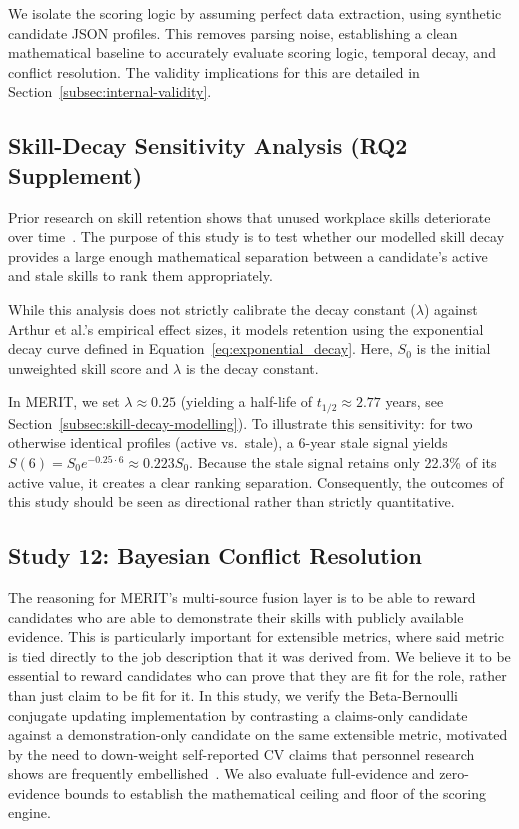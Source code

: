 We isolate the scoring logic by assuming perfect data extraction, using synthetic candidate JSON profiles. 
This removes parsing noise, establishing a clean mathematical baseline to accurately evaluate scoring logic, 
temporal decay, and conflict resolution. The validity implications for this are detailed
in Section~\ref{subsec:internal-validity}.

\subsection{Skill-Decay Sensitivity Analysis (RQ2 Supplement)}
\label{subsec:study-08-skill-decay}

Prior research on skill retention shows that unused workplace skills deteriorate over time~\cite{arthur1998}. 
The purpose of this study is to test whether our modelled skill decay provides a large enough mathematical 
separation between a candidate's active and stale skills to rank them appropriately. 

While this analysis does not strictly calibrate the decay constant ($\lambda$) against Arthur et al.'s empirical 
effect sizes, it models retention using the exponential decay curve defined in Equation~\ref{eq:exponential_decay}. 
Here, $S_0$ is the initial unweighted skill score and $\lambda$ is the decay constant. 

In MERIT, we set $\lambda \approx 0.25$ (yielding a half-life of $t_{1/2} \approx 2.77$ years, see 
Section~\ref{subsec:skill-decay-modelling}). To illustrate this 
sensitivity: for two otherwise identical profiles (active vs.\ stale), a 6-year stale signal yields 
$S(6) = S_0 e^{-0.25 \cdot 6} \approx 0.223 S_0$. Because the stale signal retains only 22.3\% of its active 
value, it creates a clear ranking separation. Consequently, the outcomes of this study should be seen as 
directional rather than strictly quantitative.

\subsection{Study 12: Bayesian Conflict Resolution}
\label{subsec:study-12-bayesian-conflict-resolution}

The reasoning for MERIT's multi-source fusion layer is to be able to reward candidates who are able to demonstrate their skills 
with publicly available evidence. This is particularly important for extensible metrics, where said metric is tied directly
to the job description that it was derived from. We believe it to be essential to reward candidates who can prove that they are
fit for the role, rather than just claim to be fit for it. In this study, we verify the Beta-Bernoulli conjugate updating 
implementation \cite{gelman2013bayesian} by contrasting a claims-only candidate against a demonstration-only candidate on the same extensible 
metric, motivated by the need to down-weight self-reported CV claims that personnel research shows are frequently 
embellished~\cite{henle2019_resume_fraud,dunning2004}. We also evaluate full-evidence and zero-evidence bounds to establish the 
mathematical ceiling and floor of the scoring engine.

